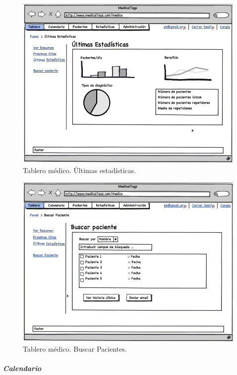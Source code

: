 			\begin{figure}[H]
			  \centering
			    \includegraphics[width=12cm]{img/png/interfaz/10_Dashboard_Medico_Tablero_Estadisticas.png}
			  \caption{Tablero médico. Últimas estadísticas.}
			  \label{fig:iu_tablero_medico_estadisticas}
			\end{figure}
			
			\begin{figure}[H]
			  \centering
			    \includegraphics[width=12cm]{img/png/interfaz/11_Dashboard_Medico_Tablero_Paciente.png}
			  \caption{Tablero médico. Buscar Pacientes.}
			  \label{fig:iu_tablero_medico_pacientes}
			\end{figure}
		
		
		
		\subparagraph{Calendario} %
		\label{par:medico_calendario}
		

